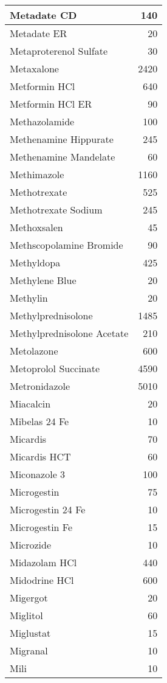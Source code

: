 \documentclass[
]{article}
\begin{document}
\begin{table}
\begin{tabular}[t]{l|r}
\hline
Metadate CD & 140\\
\hline
Metadate ER & 20\\
\hline
Metaproterenol Sulfate & 30\\
\hline
Metaxalone & 2420\\
\hline
Metformin HCl & 640\\
\hline
Metformin HCl ER & 90\\
\hline
Methazolamide & 100\\
\hline
Methenamine Hippurate & 245\\
\hline
Methenamine Mandelate & 60\\
\hline
Methimazole & 1160\\
\hline
Methotrexate & 525\\
\hline
Methotrexate Sodium & 245\\
\hline
Methoxsalen & 45\\
\hline
Methscopolamine Bromide & 90\\
\hline
Methyldopa & 425\\
\hline
Methylene Blue & 20\\
\hline
Methylin & 20\\
\hline
Methylprednisolone & 1485\\
\hline
Methylprednisolone Acetate & 210\\
\hline
Metolazone & 600\\
\hline
Metoprolol Succinate & 4590\\
\hline
Metronidazole & 5010\\
\hline
Miacalcin & 20\\
\hline
Mibelas 24 Fe & 10\\
\hline
Micardis & 70\\
\hline
Micardis HCT & 60\\
\hline
Miconazole 3 & 100\\
\hline
Microgestin & 75\\
\hline
Microgestin 24 Fe & 10\\
\hline
Microgestin Fe & 15\\
\hline
Microzide & 10\\
\hline
Midazolam HCl & 440\\
\hline
Midodrine HCl & 600\\
\hline
Migergot & 20\\
\hline
Miglitol & 60\\
\hline
Miglustat & 15\\
\hline
Migranal & 10\\
\hline
Mili & 10\\

\end{tabular}
\end{table}
\end{document}
